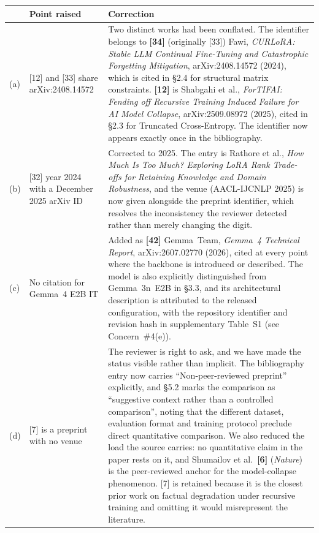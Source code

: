 \documentclass[11pt,a4paper]{article}
\newcommand{\newtext}[1]{\textcolor{chgcolor}{``#1''}}
\begin{document}
\renewcommand{\arraystretch}{1.25}
\begin{longtable}{@{}L{0.5cm}L{3.3cm}L{10.3cm}@{}}
\toprule
{} & \textbf{Point raised} & \textbf{Correction} \\
\midrule
\endfirsthead
\bottomrule
\endfoot

(a) & [12] and [33] share arXiv:2408.14572 &
Two distinct works had been conflated. The identifier belongs to
\textbf{[34]} (originally [33]) Fawi, \emph{CURLoRA: Stable LLM Continual Fine-Tuning and
Catastrophic Forgetting Mitigation}, arXiv:2408.14572 (2024), which is
cited in \S2.4 for structural matrix constraints. \textbf{[12]} is
Shabgahi et al., \emph{ForTIFAI: Fending off Recursive Training Induced
Failure for AI Model Collapse}, arXiv:2509.08972 (2025), cited in \S2.3
for Truncated Cross-Entropy. The identifier now appears exactly once in
the bibliography. \\

(b) & [32] year 2024 with a December 2025 arXiv ID &
Corrected to 2025. The entry is Rathore et al., \emph{How Much Is Too
Much? Exploring LoRA Rank Trade-offs for Retaining Knowledge and Domain
Robustness}, and the venue (AACL-IJCNLP 2025) is now given
alongside the preprint identifier, which resolves the inconsistency the
reviewer detected rather than merely changing the digit. \\

(c) & No citation for Gemma~4 E2B IT &
Added as \textbf{[42]} Gemma~Team, \emph{Gemma~4 Technical Report},
arXiv:2607.02770 (2026), cited at every point where the backbone is
introduced or described. The model is also explicitly distinguished from
Gemma~3n~E2B in \S3.3, and its architectural description is attributed to
the released configuration, with the repository identifier and revision
hash in supplementary Table~S1 (see Concern~\#4(e)). \\

(d) & [7] is a preprint with no venue &
The reviewer is right to ask, and we have made the status visible rather
than implicit. The bibliography entry now carries \newtext{Non-peer-reviewed
preprint} explicitly, and \S5.2 marks the comparison as
\newtext{suggestive context rather than a controlled comparison}, noting
that the different dataset, evaluation format and training protocol
preclude direct quantitative comparison. We also reduced the load the
source carries: no quantitative claim in the paper rests on it, and
Shumailov et al.~\textbf{[6]} (\emph{Nature}) is the peer-reviewed anchor
for the model-collapse phenomenon. [7] is retained because it is the
closest prior work on factual degradation under recursive training and
omitting it would misrepresent the literature. \\


\end{longtable}
\end{document}

